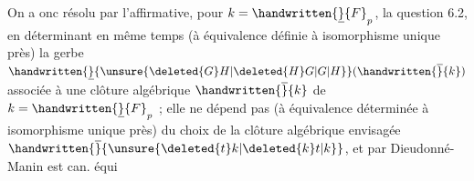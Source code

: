  On a onc  résolu par l'affirmative, pour $k=\handwritten{\underline}{F}_p$, la question 6.2, en déterminant en même temps (à équivalence définie à isomorphisme unique près) la gerbe $\handwritten{\underline}{\unsure{\deleted{G}H|\deleted{H}G|G|H}}(\handwritten{\overline}{k})$ associée à une clôture algébrique $\handwritten{\overline}{k}$ de $k=\handwritten{\underline}{F}_p$ ;  elle ne dépend pas (à  équivalence déterminée à isomorphisme unique près) du choix de la clôture algébrique envisagée $\handwritten{\overline}{\unsure{\deleted{t}k|\deleted{k}t|k}}$, et par Dieudonné-Manin est can. équi%

